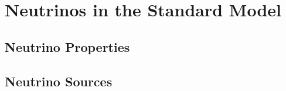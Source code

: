 \setchapterpreamble[u]{\margintoc}
\chapter{Neutrinos in the Standard Model}


\section{Neutrino Properties}

\section{Neutrino Sources}

